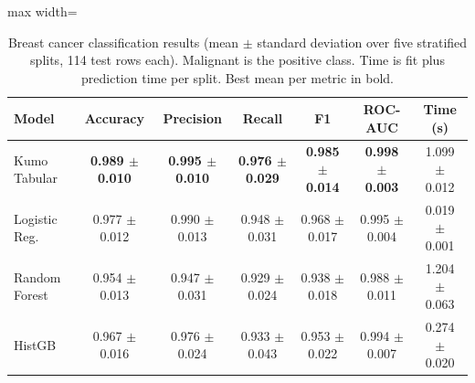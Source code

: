 \begin{table}[t]
\centering
\caption{Breast cancer classification results (mean $\pm$ standard deviation over five stratified splits, 114 test rows each). Malignant is the positive class. Time is fit plus prediction time per split. Best mean per metric in bold.}
\label{tab:classification}
\setlength{\tabcolsep}{5pt}
\smallskip
\begin{adjustbox}{max width=\textwidth}
\begin{tabular}{lcccccc}
\toprule
Model & Accuracy & Precision & Recall & F1 & ROC-AUC & Time (s) \\
\midrule
Kumo Tabular & \textbf{0.989 $\pm$ 0.010} & \textbf{0.995 $\pm$ 0.010} & \textbf{0.976 $\pm$ 0.029} & \textbf{0.985 $\pm$ 0.014} & \textbf{0.998 $\pm$ 0.003} & 1.099 $\pm$ 0.012 \\
Logistic Reg. & 0.977 $\pm$ 0.012 & 0.990 $\pm$ 0.013 & 0.948 $\pm$ 0.031 & 0.968 $\pm$ 0.017 & 0.995 $\pm$ 0.004 & 0.019 $\pm$ 0.001 \\
Random Forest & 0.954 $\pm$ 0.013 & 0.947 $\pm$ 0.031 & 0.929 $\pm$ 0.024 & 0.938 $\pm$ 0.018 & 0.988 $\pm$ 0.011 & 1.204 $\pm$ 0.063 \\
HistGB & 0.967 $\pm$ 0.016 & 0.976 $\pm$ 0.024 & 0.933 $\pm$ 0.043 & 0.953 $\pm$ 0.022 & 0.994 $\pm$ 0.007 & 0.274 $\pm$ 0.020 \\
\bottomrule
\end{tabular}
\end{adjustbox}
\end{table}
